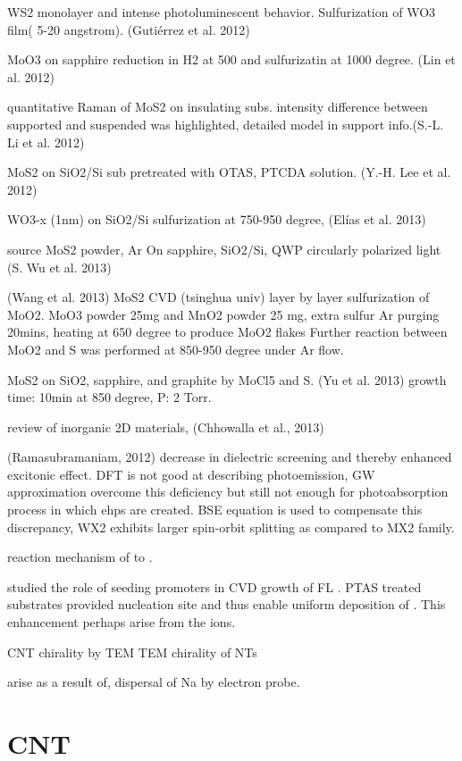 WS2 monolayer and intense photoluminescent behavior. Sulfurization of WO3 film( 5-20 angstrom). (Gutiérrez et al. 2012)

MoO3 on sapphire reduction in H2 at 500 and sulfurizatin at 1000 degree. (Lin et al. 2012)

quantitative Raman of MoS2 on insulating subs. intensity difference between supported and suspended was highlighted, detailed model in support info.(S.-L. Li et al. 2012)

MoS2 on SiO2/Si sub pretreated with OTAS, PTCDA solution. (Y.-H. Lee et al. 2012)

WO3-x (1nm) on SiO2/Si sulfurization at 750-950 degree, (Elías et al. 2013)\cite{Elias2013}

source MoS2 powder, Ar On sapphire, SiO2/Si, QWP circularly polarized  light (S. Wu et al. 2013)

(Wang et al. 2013) MoS2 CVD (tsinghua univ) layer by layer sulfurization of MoO2.
MoO3 powder 25mg and MnO2 powder 25 mg, extra sulfur Ar purging  20mins, heating at 650 degree to produce MoO2 flakes
Further reaction between MoO2 and S was performed at 850-950 degree under Ar flow.

MoS2 on SiO2, sapphire, and graphite by MoCl5 and S. (Yu et al. 2013)
growth time: 10min at 850 degree, P: 2 Torr.

review of inorganic 2D materials, (Chhowalla et al., 2013)

(Ramasubramaniam, 2012) decrease in dielectric screening and thereby enhanced excitonic effect.
DFT is not good at describing photoemission, GW approximation overcome this deficiency but still not enough for photoabsorption process in which ehps are created. BSE equation is used to compensate this discrepancy,
WX2 exhibits larger spin-orbit splitting as compared to MX2 family.

reaction mechanism of  to .\cite{Weber1996}

\citeauthor{Ling2014} studied the role of seeding promoters in CVD growth of FL .\cite{Ling2014} PTAS treated substrates provided nucleation site and thus enable uniform deposition of .  This enhancement perhaps arise from the  ions.

CNT chirality by TEM \cite{Zhang1993} TEM chirality of  NTs

arise as a result of, dispersal of Na by electron probe.


\section{CNT}

